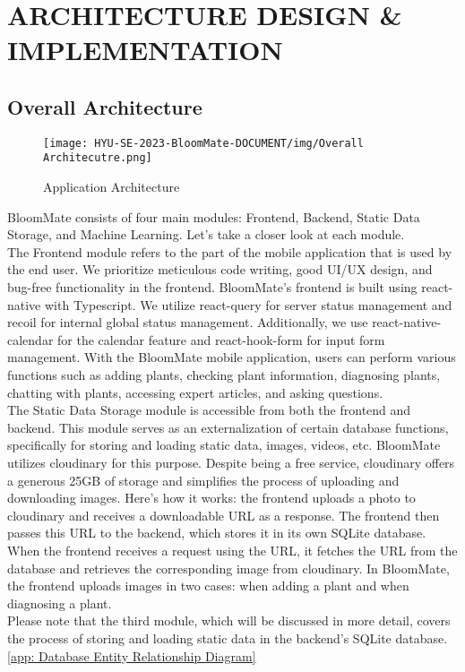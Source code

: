 \documentclass[conference, a4paper]{IEEEtran}
\begin{document}
\section{ARCHITECTURE DESIGN \& IMPLEMENTATION}
\subsection{Overall Architecture}
    \begin{figure}[h]
    \centering
    \texttt{[image: HYU-SE-2023-BloomMate-DOCUMENT/img/Overall Architecutre.png]}
    \label{fig}
    \caption{Application Architecture}
    \end{figure}
BloomMate consists of four main modules: Frontend, Backend, Static Data Storage, and Machine Learning. Let's take a closer look at each module. \\

The Frontend module refers to the part of the mobile application that is used by the end user. We prioritize meticulous code writing, good UI/UX design, and bug-free functionality in the frontend. BloomMate's frontend is built using react-native with Typescript. We utilize react-query for server status management and recoil for internal global status management. Additionally, we use react-native-calendar for the calendar feature and react-hook-form for input form management. With the BloomMate mobile application, users can perform various functions such as adding plants, checking plant information, diagnosing plants, chatting with plants, accessing expert articles, and asking questions.\\
\newline
\indent The Static Data Storage module is accessible from both the frontend and backend. This module serves as an externalization of certain database functions, specifically for storing and loading static data, images, videos, etc. BloomMate utilizes cloudinary for this purpose. Despite being a free service, cloudinary offers a generous 25GB of storage and simplifies the process of uploading and downloading images. Here's how it works: the frontend uploads a photo to cloudinary and receives a downloadable URL as a response. The frontend then passes this URL to the backend, which stores it in its own SQLite database. When the frontend receives a request using the URL, it fetches the URL from the database and retrieves the corresponding image from cloudinary. In BloomMate, the frontend uploads images in two cases: when adding a plant and when diagnosing a plant.\\
\newline
\indent Please note that the third module, which will be discussed in more detail, covers the process of storing and loading static data in the backend's SQLite database.\ref{app: Database Entity Relationship Diagram}
\end{document}
